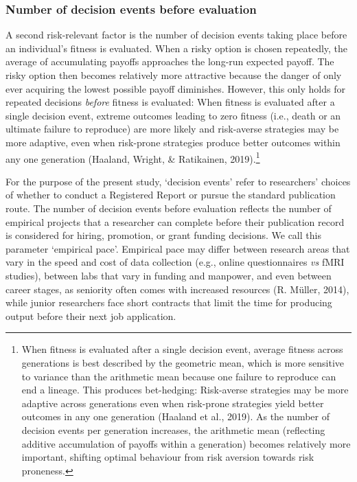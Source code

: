 \documentclass[
  british,
  a4paper,
  ,man,mask,floatsintext]{apa6}
\begin{document}
\subsubsection{Number of decision events before evaluation}\label{number-of-decision-events-before-evaluation}

A second risk-relevant factor is the number of decision events taking place before an individual's fitness is evaluated.
When a risky option is chosen repeatedly, the average of accumulating payoffs approaches the long-run expected payoff.
The risky option then becomes relatively more attractive because the danger of only ever acquiring the lowest possible payoff diminishes.
However, this only holds for repeated decisions \emph{before} fitness is evaluated:
When fitness is evaluated after a single decision event, extreme outcomes leading to zero fitness (i.e., death or an ultimate failure to reproduce) are more likely and risk-averse strategies may be more adaptive, even when risk-prone strategies produce better outcomes within any one generation (Haaland, Wright, \& Ratikainen, 2019).\footnote{When fitness is evaluated after a single decision event, average fitness across generations is best described by the geometric mean, which is more sensitive to variance than the arithmetic mean because one failure to reproduce can end a lineage. This produces bet-hedging: Risk-averse strategies may be more adaptive across generations even when risk-prone strategies yield better outcomes in any one generation (Haaland et al., 2019). As the number of decision events per generation increases, the arithmetic mean (reflecting additive accumulation of payoffs within a generation) becomes relatively more important, shifting optimal behaviour from risk aversion towards risk proneness.}

For the purpose of the present study, `decision events' refer to researchers' choices of whether to conduct a Registered Report or pursue the standard publication route.
The number of decision events before evaluation reflects the number of empirical projects that a researcher can complete before their publication record is considered for hiring, promotion, or grant funding decisions.
We call this parameter `empirical pace'.
Empirical pace may differ between research areas that vary in the speed and cost of data collection (e.g., online questionnaires \emph{vs} fMRI studies), between labs that vary in funding and manpower, and even between career stages, as seniority often comes with increased resources (R. Müller, 2014), while junior researchers face short contracts that limit the time for producing output before their next job application.
\end{document}
